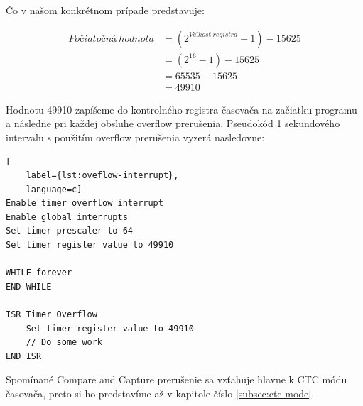 Čo v našom konkrétnom prípade predstavuje:

\begin{equation}
    \begin{aligned}
        Počiatočná\:hodnota & =  (2^{Veľkosť\:registra} - 1) - 15625 \\
                            & =  (2^{16} - 1) - 15625                \\
                            & =  65535 - 15625                       \\
                            & =  49910
    \end{aligned}
\end{equation}

Hodnotu 49910 zapíšeme do kontrolného registra časovača na začiatku programu a následne pri
každej obsluhe overflow prerušenia. Pseudokód 1 sekundového intervalu s použitím overflow prerušenia vyzerá nasledovne:

\begin{lstlisting}[
    label={lst:oveflow-interrupt},
    language=c]  
Enable timer overflow interrupt
Enable global interrupts
Set timer prescaler to 64
Set timer register value to 49910

WHILE forever
END WHILE

ISR Timer Overflow
    Set timer register value to 49910
    // Do some work
END ISR

\end{lstlisting}

Spomínané Compare and Capture prerušenie sa vzťahuje hlavne k CTC módu časovača, preto si ho predstavíme až v kapitole číslo \ref{subsec:ctc-mode}.

